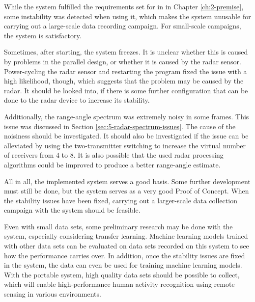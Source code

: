 While the system fulfilled the requirements set for in in Chapter \ref{ch:2-premise},
some instability was detected when using it,
which makes the system unusable for carrying out a large-scale data recording campaign.
For small-scale campaigns, the system is satisfactory.

Sometimes, after starting, the system freezes.
It is unclear whether this is caused by problems in the parallel design,
or whether it is caused by the radar sensor.
Power-cycling the radar sensor and restarting the program fixed the issue with a high likelihood, though,
which suggests that the problem may be caused by the radar.
It should be looked into, if there is some further configuration that can be done to the radar device to increase its stability.

Additionally, the range-angle spectrum was extremely noisy in some frames.
This issue was discussed in Section \ref{sec:5-radar-spectrum-issues}.
The cause of the noisiness should be investigated.
It should also be investigated if the issue can be alleviated by using the two-transmitter switching to increase the virtual number
of receivers from 4 to 8.
It is also possible that the used radar processing algorithms could be improved to produce a better range-angle estimate.

All in all, the implemented system serves a good basis.
Some further development must still be done,
but the system serves as a very good Proof of Concept.
When the stability issues have been fixed,
carrying out a larger-scale data collection campaign with the system should be feasible.

Even with small data sets, some preliminary research may be done with the system, especially considering transfer learning.
Machine learning models trained with other data sets can be evaluated on data sets recorded on this system to see how the performance carries over.
In addition, once the stability issues are fixed in the system,
the data can even be used for training machine learning models.
With the portable system, high quality data sets should be possible to collect,
which will enable high-performance human activity recognition using remote sensing in various environments.